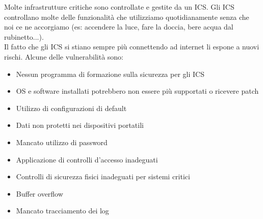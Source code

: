 Molte infrastrutture critiche sono controllate e gestite da un \acrfull{ICS}.
Gli \acrshort{ICS} controllano molte delle funzionalità che utilizziamo quotidianamente senza che noi ce ne accorgiamo (es: accendere la luce, fare la doccia, bere acqua dal rubinetto...).\\
Il fatto che gli \acrshort{ICS} si stiano sempre più connettendo ad internet li espone a nuovi rischi.
Alcune delle vulnerabilità sono:
\begin{itemize}[noitemsep]
    \item Nessun programma di formazione sulla sicurezza per gli \acrshort{ICS}
    \item \acrshort{OS} e software installati potrebbero non essere più supportati o ricevere patch
    \item Utilizzo di configurazioni di default
    \item Dati non protetti nei dispositivi portatili
    \item Mancato utilizzo di password
    \item Applicazione di controlli d'accesso inadeguati
    \item Controlli di sicurezza fisici inadeguati per sistemi critici
    \item Buffer overflow
    \item Mancato tracciamento dei log
\end{itemize}

